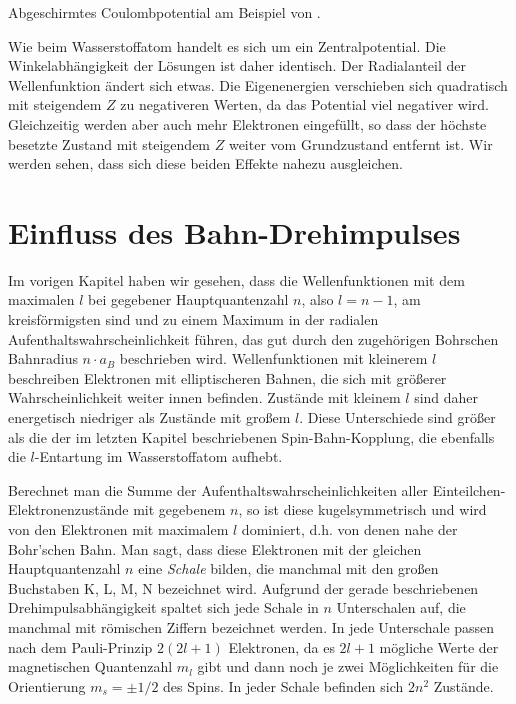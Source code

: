 \begin{marginfigure}
    \caption{Abgeschirmtes Coulombpotential am Beispiel von . }
    \label{fig:6_coulomb_schirm}
\end{marginfigure}

Wie beim Wasserstoffatom handelt es sich um ein Zentralpotential. Die Winkelabhängigkeit der Lösungen ist daher identisch. Der Radialanteil der Wellenfunktion ändert sich etwas. Die Eigenenergien verschieben sich quadratisch mit steigendem $Z$ zu negativeren Werten, da das Potential viel negativer wird. Gleichzeitig werden aber auch mehr Elektronen eingefüllt, so dass der höchste besetzte Zustand mit steigendem $Z$ weiter vom Grundzustand entfernt ist. Wir werden sehen, dass sich diese beiden Effekte nahezu ausgleichen.


\section{Einfluss des Bahn-Drehimpulses}

Im vorigen Kapitel haben wir gesehen, dass die Wellenfunktionen mit dem maximalen $l$ bei gegebener Hauptquantenzahl $n$, also $l=n-1$, am kreisförmigsten sind und zu einem Maximum in der radialen Aufenthaltswahrscheinlichkeit führen, das gut durch den zugehörigen Bohrschen Bahnradius $n \cdot a_B$ beschrieben wird. Wellenfunktionen mit kleinerem $l$ beschreiben Elektronen mit elliptischeren Bahnen, die sich mit größerer Wahrscheinlichkeit weiter innen befinden. Zustände mit kleinem $l$ sind daher energetisch niedriger als Zustände mit großem $l$. Diese Unterschiede sind größer als die der im letzten Kapitel beschriebenen Spin-Bahn-Kopplung, die ebenfalls die $l$-Entartung im Wasserstoffatom aufhebt.

Berechnet man die Summe der Aufenthaltswahrscheinlichkeiten aller Einteilchen-Elektronenzustände mit gegebenem $n$, so ist diese kugelsymmetrisch und wird von den Elektronen mit maximalem $l$ dominiert, d.h. von denen nahe  der Bohr'schen Bahn. 
Man sagt, dass diese Elektronen mit der gleichen Hauptquantenzahl $n$ eine \emph{Schale} bilden, die manchmal mit den großen Buchstaben K, L, M, N bezeichnet wird.  Aufgrund der gerade beschriebenen Drehimpulsabhängigkeit spaltet sich jede Schale in $n$ Unterschalen auf, die manchmal mit römischen Ziffern bezeichnet werden. In jede Unterschale passen nach dem Pauli-Prinzip $2 (2l +1)$ Elektronen, da es $2l +1$ mögliche Werte der magnetischen Quantenzahl $m_l$ gibt und dann noch je zwei Möglichkeiten für die Orientierung $m_s = \pm 1/2$ des Spins. In jeder Schale befinden sich $2n^2$ Zustände.

